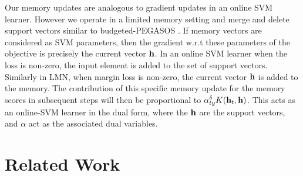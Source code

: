 \documentclass[letterpaper]{article} %
\newcommand{\vek}[1]{{\bf {#1}}}
\newcommand{\vh}{{\vek{h}}}
\def\sunita#1{\todo [color=purple]{Sunita: #1}}
\begin{document}
Our memory updates are analogous to gradient updates in an online SVM learner. However we operate in a limited memory setting and merge and delete support vectors similar to budgeted-PEGASOS \cite{WangCV10}. If memory vectors are considered as SVM parameters, then the gradient w.r.t these parameters of the objective is precisely the current vector $\bf{h}$. In an online SVM learner when the loss is non-zero, the input element is added to the set of support vectors. Similarly in LMN, when margin loss is non-zero, the current vector $\bf{h}$ is added to the memory. The contribution of this specific memory update for the memory scores in subsequent steps will then be proportional to $\alpha_{ty}^\delta K(\vh_t, \bf{h})$. This acts as an online-SVM learner in the dual form, where the $\bf{h}$ are the support vectors, and $\alpha$ act as the associated dual variables. 





\section{Related Work}
\end{document}
